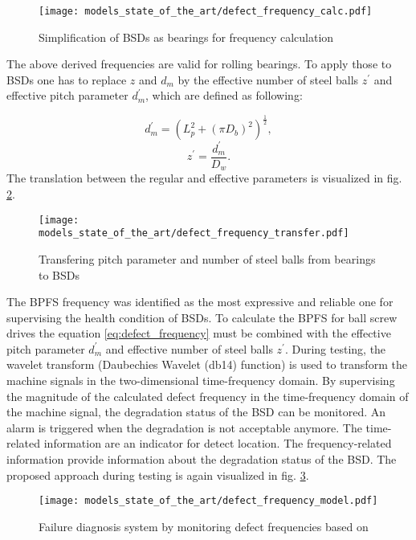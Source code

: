 \begin{figure}[H]
  \centering
  \texttt{[image: models\_state\_of\_the\_art/defect\_frequency\_calc.pdf]}
  \caption{Simplification of BSDs as bearings for frequency calculation \cite{Lee2015}}
  \label{fig:defect_frequency_calc}
\end{figure}

The above derived frequencies are valid for rolling bearings. To apply those to BSDs one has to replace $z$ and $d_{m}$ by the effective number of steel balls $z^{'}$ and effective pitch parameter $d_{m}^{'}$, which are defined as following:

\begin{equation}
    d_{m}^{'} = (L_{p}^{2}+(\pi D_{b})^{2})^{\frac{1}{2}},
\end{equation}
\begin{equation}
    z^{'} = \frac{d_{m}^{'}}{D_{w}}.
\end{equation}
The translation between the regular and effective parameters is visualized in fig. \ref{fig:defect_frequency_transfer}. 

\begin{figure}[H]
  \centering
  \texttt{[image: models\_state\_of\_the\_art/defect\_frequency\_transfer.pdf]}
  \caption{Transfering pitch parameter and number of steel balls from bearings to BSDs \cite{Lee2015}}
  \label{fig:defect_frequency_transfer}
\end{figure}

The BPFS frequency was identified as the most expressive and reliable one for supervising the health condition of BSDs. To calculate the BPFS for ball screw drives the equation \ref{eq:defect_frequency} must be combined with the effective pitch parameter $d_{m}^{'}$ and effective number of steel balls $z^{'}$. During testing, the wavelet transform (Daubechies Wavelet (db14) function) is used to transform the machine signals in the two-dimensional time-frequency domain. By supervising the magnitude of the calculated defect frequency in the time-frequency domain of the machine signal, the degradation status of the BSD can be monitored. An alarm is triggered when the degradation is not acceptable anymore. The time-related information are an indicator for detect location. The frequency-related information provide information about the degradation status of the BSD. The proposed approach during testing is again visualized in fig. \ref{fig:defect_frequency_model}. 


\begin{figure}[H]
  \centering
  \texttt{[image: models\_state\_of\_the\_art/defect\_frequency\_model.pdf]}
  \caption{Failure diagnosis system by monitoring defect frequencies based on \cite{Lee2015}}
  \label{fig:defect_frequency_model}
\end{figure}


